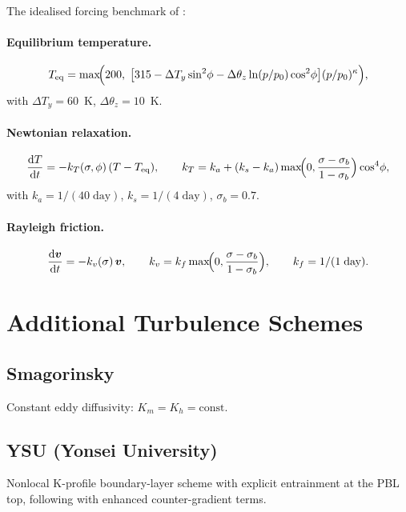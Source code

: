 \documentclass[11pt,twoside]{report}
\newcommand{\dd}{\mathrm{d}}
\newcommand{\pref}{p_0}
\newcommand{\vect}[1]{\bm{#1}}
\begin{document}
The idealised forcing benchmark of \citet{HeldSuarez1994}:

\paragraph{Equilibrium temperature.}
\begin{equation}
  T_{\mathrm{eq}} = \max\!\Bigl(200,\;
  \bigl[315-\Delta T_y\sin^2\!\phi
  - \Delta\theta_z\ln(p/\pref)\cos^2\!\phi\bigr]
  (p/\pref)^\kappa\Bigr),
\end{equation}
with $\Delta T_y=60$~K, $\Delta\theta_z=10$~K.

\paragraph{Newtonian relaxation.}
\begin{equation}
  \frac{\dd T}{\dd t} = -k_T(\sigma,\phi)\,(T-T_{\mathrm{eq}}),
  \qquad
  k_T = k_a + (k_s-k_a)\max\!\Bigl(0,\frac{\sigma-\sigma_b}{1-\sigma_b}\Bigr)
  \cos^4\!\phi,
\end{equation}
with $k_a=1/(40\;\text{day})$, $k_s=1/(4\;\text{day})$, $\sigma_b=0.7$.

\paragraph{Rayleigh friction.}
\begin{equation}
  \frac{\dd\vect{v}}{\dd t} = -k_v(\sigma)\,\vect{v},
  \qquad
  k_v = k_f\max\!\Bigl(0,\frac{\sigma-\sigma_b}{1-\sigma_b}\Bigr),
  \qquad k_f=1/(1\;\text{day}).
\end{equation}


\section{Additional Turbulence Schemes}

\subsection{Smagorinsky}
Constant eddy diffusivity: $K_m = K_h = \mathrm{const}$.

\subsection{YSU (Yonsei University)}
Nonlocal K-profile boundary-layer scheme with explicit entrainment at the PBL top, following \citet{HoltslagBoville1993} with enhanced counter-gradient terms.
\end{document}
